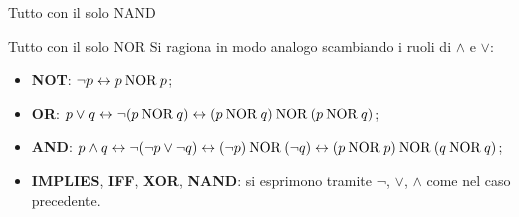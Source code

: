 \begin{concetto}
\begin{dimostrazione}
\begin{caso}{Tutto con il solo NAND}
    \end{caso}
    \begin{caso}{Tutto con il solo NOR}
        Si ragiona in modo analogo scambiando i ruoli di $\wedge$ e $\vee$:
        \begin{itemize}
            \item \textbf{NOT}: $\neg p \leftrightarrow p \mathbin{\mathrm{NOR}} p$;
            \item \textbf{OR}: $p \vee q \leftrightarrow \neg(p \mathbin{\mathrm{NOR}} q) \leftrightarrow (p \mathbin{\mathrm{NOR}} q) \mathbin{\mathrm{NOR}} (p \mathbin{\mathrm{NOR}} q)$;
            \item \textbf{AND}: $p \wedge q \leftrightarrow \neg(\neg p \vee \neg q) \leftrightarrow (\neg p) \mathbin{\mathrm{NOR}} (\neg q) \leftrightarrow (p \mathbin{\mathrm{NOR}} p) \mathbin{\mathrm{NOR}} (q \mathbin{\mathrm{NOR}} q)$;
            \item \textbf{IMPLIES}, \textbf{IFF}, \textbf{XOR}, \textbf{NAND}: si esprimono tramite $\neg$, $\vee$, $\wedge$ come nel caso precedente.
        \end{itemize}
    \end{caso}
\end{dimostrazione}
\end{concetto}

